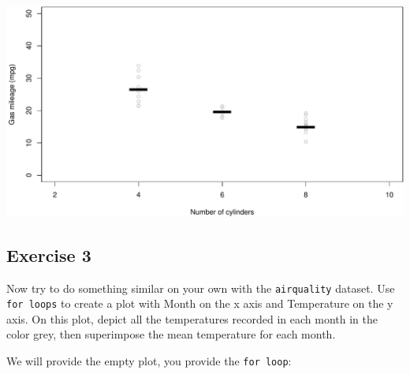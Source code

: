 \documentclass[
]{book}
\newenvironment{Shaded}{\begin{snugshade}}{\end{snugshade}}
\newcommand{\AttributeTok}[1]{\textcolor[rgb]{0.77,0.63,0.00}{#1}}
\newcommand{\CommentTok}[1]{\textcolor[rgb]{0.56,0.35,0.01}{\textit{#1}}}
\newcommand{\ControlFlowTok}[1]{\textcolor[rgb]{0.13,0.29,0.53}{\textbf{#1}}}
\newcommand{\DecValTok}[1]{\textcolor[rgb]{0.00,0.00,0.81}{#1}}
\newcommand{\FunctionTok}[1]{\textcolor[rgb]{0.00,0.00,0.00}{#1}}
\newcommand{\NormalTok}[1]{#1}
\newcommand{\OtherTok}[1]{\textcolor[rgb]{0.56,0.35,0.01}{#1}}
\newcommand{\SpecialCharTok}[1]{\textcolor[rgb]{0.00,0.00,0.00}{#1}}
\newcommand{\StringTok}[1]{\textcolor[rgb]{0.31,0.60,0.02}{#1}}
\begin{document}
\includegraphics{figures/unnamed-chunk-310-1.pdf}

\hypertarget{exercise-3-3}{%
\subsection*{Exercise 3}\label{exercise-3-3}}

Now try to do something similar on your own with the \texttt{airquality} dataset. Use \texttt{for\ loops} to create a plot with Month on the x axis and Temperature on the y axis. On this plot, depict all the temperatures recorded in each month in the color grey, then superimpose the mean temperature for each month.

We will provide the empty plot, you provide the \texttt{for\ loop}:

\begin{Shaded}
\end{Shaded}
\end{document}
